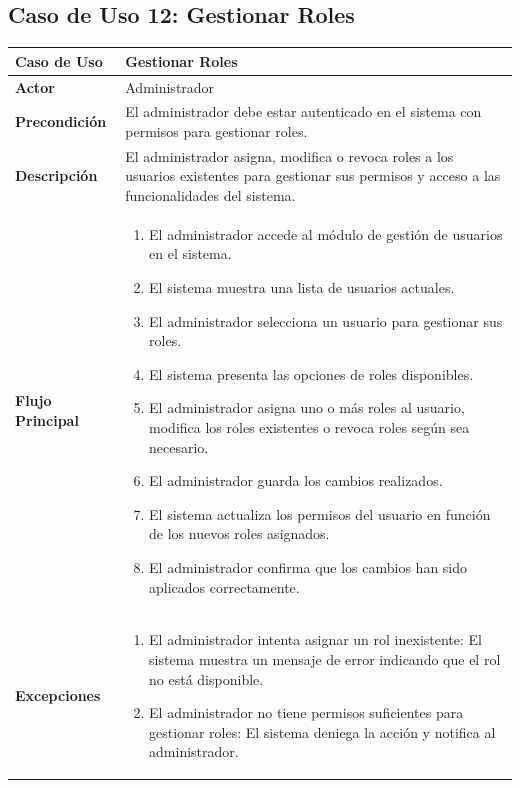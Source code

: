 \documentclass{article}
\begin{document}
\subsection{Caso de Uso 12: Gestionar Roles}

\begin{table}[H]
    \centering
    \begin{tabular}{|p{4cm}|p{11cm}|}
    \hline
    \textbf{Caso de Uso}        & \textbf{Gestionar Roles} \\ \hline
    \textbf{Actor}              & Administrador \\ \hline
    \textbf{Precondición}       & El administrador debe estar autenticado en el sistema con permisos para gestionar roles. \\ \hline
    \textbf{Descripción}        & El administrador asigna, modifica o revoca roles a los usuarios existentes para gestionar sus permisos y acceso a las funcionalidades del sistema. \\ \hline
    \textbf{Flujo Principal}    & 
    \begin{enumerate}
        \item El administrador accede al módulo de gestión de usuarios en el sistema.
        \item El sistema muestra una lista de usuarios actuales.
        \item El administrador selecciona un usuario para gestionar sus roles.
        \item El sistema presenta las opciones de roles disponibles.
        \item El administrador asigna uno o más roles al usuario, modifica los roles existentes o revoca roles según sea necesario.
        \item El administrador guarda los cambios realizados.
        \item El sistema actualiza los permisos del usuario en función de los nuevos roles asignados.
        \item El administrador confirma que los cambios han sido aplicados correctamente.
    \end{enumerate} \\ \hline
    \textbf{Excepciones}        & 
    \begin{enumerate}
        \item El administrador intenta asignar un rol inexistente: El sistema muestra un mensaje de error indicando que el rol no está disponible.
        \item El administrador no tiene permisos suficientes para gestionar roles: El sistema deniega la acción y notifica al administrador.

\end{enumerate}
\end{tabular}
\end{table}
\end{document}
